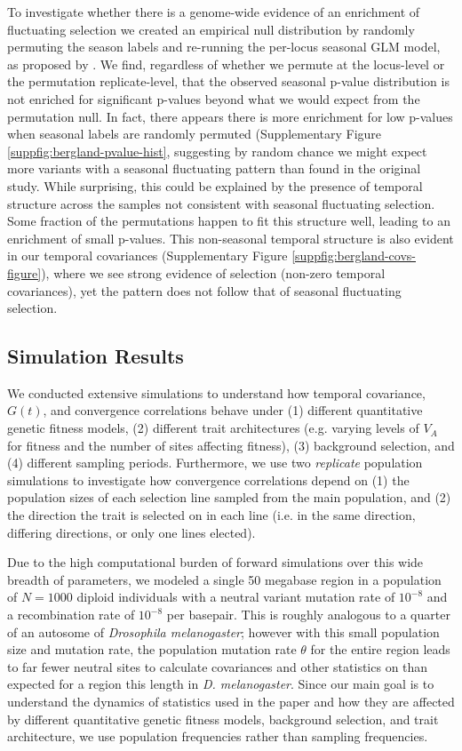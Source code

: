 \documentclass[11pt]{article}
\newcommand{\vb}[1]{{\it \color{blue} #1}}
\begin{document}
{To investigate whether there is a genome-wide evidence of an enrichment of
fluctuating selection we created an empirical null distribution by randomly
permuting the season labels and re-running the per-locus seasonal GLM model, as
proposed by \textcite{Machado2018-cs}. We find, regardless of whether we
permute at the locus-level or the permutation replicate-level, that the
observed seasonal p-value distribution \textcite{Bergland2014-ij} is not
enriched for significant p-values beyond what we would expect from the
permutation null. In fact, there appears there is more enrichment for low
p-values when seasonal labels are randomly permuted (Supplementary Figure
\ref{suppfig:bergland-pvalue-hist}, suggesting by random chance we might expect
more variants with a seasonal fluctuating pattern than found in the original
\textcite{Bergland2014-ij} study. While surprising, this could be explained by
the presence of temporal structure across the samples not consistent with
seasonal fluctuating selection. Some fraction of the permutations happen to fit
this structure well, leading to an enrichment of small p-values. This
non-seasonal temporal structure is also evident in our temporal covariances
(Supplementary Figure \ref{suppfig:bergland-covs-figure}), where we see strong
evidence of selection (non-zero temporal covariances), yet the pattern does not
follow that of seasonal fluctuating selection.  


\subsection{Simulation Results}

We conducted extensive simulations to understand how temporal covariance,
$G(t)$, and convergence correlations behave under (1) different quantitative
genetic fitness models, (2) different trait architectures (e.g. varying levels
of $V_A$ for fitness and the number of sites affecting fitness), (3) background
selection, and (4) different sampling periods. Furthermore, we use two
\vb{replicate} population simulations to investigate how convergence
correlations depend on (1) the population sizes of each selection line sampled
from the main population, and (2) the direction the trait is selected on in
each line (i.e.  in the same direction, differing directions, or only one lines
elected).

Due to the high computational burden of forward simulations over this wide
breadth of parameters, we modeled a single 50 megabase region in a population
of $N = 1000$ diploid individuals with a neutral variant mutation rate of
$10^{-8}$ and a recombination rate of $10^{-8}$ per basepair. This is roughly
analogous to a quarter of an autosome of \emph{Drosophila melanogaster};
however with this small population size and mutation rate, the population
mutation rate $\theta$ for the entire region leads to far fewer neutral sites
to calculate covariances and other statistics on than expected for a region
this length in \emph{D.  melanogaster}. Since our main goal is to understand
the dynamics of statistics used in the paper and how they are affected by
different quantitative genetic fitness models, background selection, and trait
architecture, we use population frequencies rather than sampling frequencies. 

}
\end{document}
